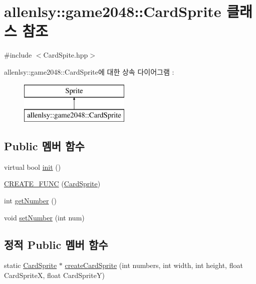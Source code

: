 \hypertarget{classallenlsy_1_1game2048_1_1_card_sprite}{}\section{allenlsy\+:\+:game2048\+:\+:Card\+Sprite 클래스 참조}
\label{classallenlsy_1_1game2048_1_1_card_sprite}


{\ttfamily \#include $<$Card\+Spite.\+hpp$>$}

allenlsy\+:\+:game2048\+:\+:Card\+Sprite에 대한 상속 다이어그램 \+: \begin{figure}[H]
\begin{center}
\leavevmode
\includegraphics[height=2.000000cm]{classallenlsy_1_1game2048_1_1_card_sprite}
\end{center}
\end{figure}
\subsection*{Public 멤버 함수}
\begin{DoxyCompactItemize}
\item 
virtual bool \hyperlink{classallenlsy_1_1game2048_1_1_card_sprite_ad6769d950c3b9b87092bd7e40d61dd4d}{init} ()
\item 
\hyperlink{classallenlsy_1_1game2048_1_1_card_sprite_acb47a7c82b77019fab80d7d167495c57}{C\+R\+E\+A\+T\+E\+\_\+\+F\+U\+NC} (\hyperlink{classallenlsy_1_1game2048_1_1_card_sprite}{Card\+Sprite})
\item 
int \hyperlink{classallenlsy_1_1game2048_1_1_card_sprite_ac483e81f56c1c7d08a83175061c8edb5}{get\+Number} ()
\item 
void \hyperlink{classallenlsy_1_1game2048_1_1_card_sprite_a7f560bb8253477188273aac709aae087}{set\+Number} (int num)
\end{DoxyCompactItemize}
\subsection*{정적 Public 멤버 함수}
\begin{DoxyCompactItemize}
\item 
static \hyperlink{classallenlsy_1_1game2048_1_1_card_sprite}{Card\+Sprite} $\ast$ \hyperlink{classallenlsy_1_1game2048_1_1_card_sprite_a3a14745470040dfb933397ccb83344d7}{create\+Card\+Sprite} (int numbers, int width, int height, float Card\+SpriteX, float Card\+SpriteY)
\end{DoxyCompactItemize}


